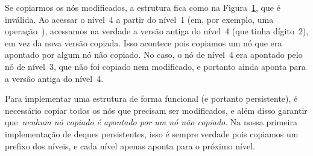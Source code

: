 \documentclass[main.tex]{subfiles}
\begin{document}
\begin{figure}
\centering
{}
\caption{} \label{fig:func_ex1res}
\end{figure}

Se copiarmos os nós modificados, a estrutura fica como na Figura~\ref{fig:func_ex1res}, que é inválida. Ao acessar o nível~4 a partir do nível~1 (em, por exemplo, uma operação~), acessamos na verdade a versão antiga do nível~4 (que tinha dígito~2), em vez da nova versão copiada. Isso acontece pois copiamos um nó que era apontado por algum nó não copiado. No caso, o nó de nível~4 era apontado pelo nó de nível~3, que não foi copiado nem modificado, e portanto ainda aponta para a versão antiga do nível~4.

Para implementar uma estrutura de forma funcional (e portanto persistente), é necessário copiar todos os nós que precisam ser modificados, e além disso garantir que~\emph{nenhum nó copiado é apontado por um nó não copiado}. Na nossa primeira implementação de deques persistentes, isso é sempre verdade pois copiamos um prefixo dos níveis, e cada nível apenas aponta para o próximo nível.
\end{document}
